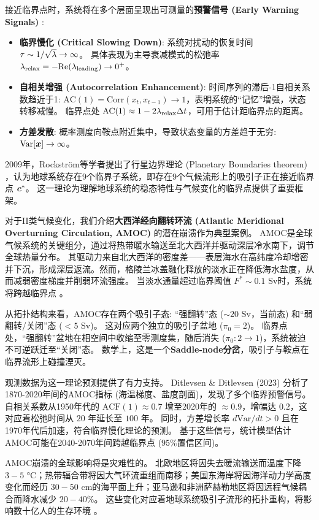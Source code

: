 接近临界点时，系统将在多个层面呈现出可测量的\textbf{预警信号 (Early Warning Signals)} \cite{scheffer2009early}:
\begin{itemize}
    \item \textbf{临界慢化 (Critical Slowing Down)}:
    系统对扰动的恢复时间 $\tau \sim 1/\sqrt{\lambda} \to \infty$。
    具体表现为主导衰减模式的松弛率 $\lambda_{\text{relax}} = -\mathrm{Re}(\lambda_{\text{leading}}) \to 0^+$。
    \item \textbf{自相关增强 (Autocorrelation Enhancement)}:
    时间序列的滞后-1自相关系数趋近于1: $\mathrm{AC}(1) = \mathrm{Corr}(x_t, x_{t-1}) \to 1$，表明系统的“记忆”增强，状态转移减慢。
    临界点处 $\mathrm{AC}(1) \approx 1 - 2\lambda_{\text{relax}}\Delta t$，可用于估计距临界点的距离。
    \item \textbf{方差发散}:
    概率测度向鞍点附近集中，导致状态变量的方差趋于无穷: $\mathrm{Var}[\bm{x}] \to \infty$。
\end{itemize}

2009年，Rockström等学者提出了行星边界理论 (Planetary Boundaries theorem) \cite{rockstrom2009planetary}，认为地球系统存在9个临界子系统，即存在9个气候流形上的吸引子正在接近临界点 $\bm{c}^*$。
这一理论为理解地球系统的稳态特性与气候变化的临界点提供了重要框架。

对于II类气候变化，我们介绍\textbf{大西洋经向翻转环流 (Atlantic Meridional Overturning Circulation, AMOC)} 的潜在崩溃作为典型案例。
AMOC是全球气候系统的关键组分，通过将热带暖水输送至北大西洋并驱动深层冷水南下，调节全球热量分布。
其驱动力来自北大西洋的密度差——表层海水在高纬度冷却增密并下沉，形成深层返流。然而，格陵兰冰盖融化释放的淡水正在降低海水盐度，从而减弱密度梯度并削弱环流强度。
当淡水通量超过临界阈值 $F^* \sim 0.1$ Sv时，系统将跨越临界点 \cite{stommel1961thermohaline,lenton2008tipping,dijkstra2005stability}。

从拓扑结构来看，AMOC存在两个吸引子态: “强翻转”态 ($\sim 20$ Sv，当前态) 和“弱翻转/关闭”态 ($< 5$ Sv)。
这对应两个独立的吸引子盆地 ($\pi_0 = 2$)。
临界点处，“强翻转”盆地在相空间中收缩至零测度集，随后消失 ($\pi_0: 2 \to 1$)，系统被迫不可逆跃迁至“关闭”态。
数学上，这是一个\textbf{Saddle-node分岔}，吸引子与鞍点在临界流形上碰撞湮灭。

观测数据为这一理论预测提供了有力支持。
Ditlevsen \& Ditlevsen (2023) \cite{ditlevsen2023warning} 分析了1870-2020年间的AMOC指标 (海温梯度、盐度剖面)，发现了多个临界预警信号。
自相关系数从1950年代的 $\mathrm{ACF}(1) \approx 0.7$ 增至2020年的 $\approx 0.9$，增幅达 $0.2$，这对应着松弛时间从 $20$ 年延长至 $100$ 年。
同时，方差增长率 $d\mathrm{Var}/dt > 0$ 且在1970年代后加速，符合临界慢化理论的预测。
基于这些信号，统计模型估计AMOC可能在2040-2070年间跨越临界点 ($95\%$置信区间)。

AMOC崩溃的全球影响将是灾难性的。
北欧地区将因失去暖流输送而温度下降 $3-5$ °C；热带辐合带将因大气环流重组而南移；美国东海岸将因海洋动力学高度变化而经历 $30-50$ cm的海平面上升；亚马逊和非洲萨赫勒地区将因远程气候耦合而降水减少 $20-40\%$。
这些变化对应着地球系统吸引子流形的拓扑重构，将影响数十亿人的生存环境 \cite{jackson2015global,ipcc2014ar5}。
